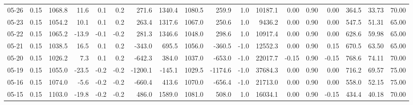\begin{threeparttable}
{\begin{tabular}{lrrrrrrrrrrrrrrrrr}
  05-26 &     0.15 & 1068.8 &              11.6 &               0.1 &                0.2 &              271.6 & 1340.4 & 1080.5 &      259.9 &                      1.0 &             10187.1 &       0.00 &      0.90 &           0.00 &            364.5 &           33.73 &                  70.00 \\
  05-23 &     0.15 & 1054.2 &              10.1 &               0.1 &                0.2 &              263.4 & 1317.6 & 1067.0 &      250.6 &                      1.0 &              9436.2 &       0.00 &      0.90 &           0.00 &            547.5 &           51.31 &                  65.00 \\
  05-22 &     0.15 & 1065.2 &             -13.9 &              -0.1 &               -0.2 &              281.3 & 1346.6 & 1048.0 &      298.6 &                      1.0 &             10917.4 &       0.00 &      0.90 &           0.00 &            628.6 &           59.98 &                  65.00 \\
  05-21 &     0.15 & 1038.5 &              16.5 &               0.1 &                0.2 &             -343.0 &  695.5 & 1056.0 &     -360.5 &                     -1.0 &             12552.3 &       0.00 &      0.90 &           0.15 &            670.5 &           63.50 &                  65.00 \\
  05-20 &     0.15 & 1026.2 &               7.3 &               0.1 &                0.2 &             -642.3 &  384.0 & 1037.0 &     -653.0 &                     -1.0 &             22017.7 &      -0.15 &      0.90 &          -0.15 &            768.6 &           74.11 &                  70.00 \\
  05-19 &     0.15 & 1055.0 &             -23.5 &              -0.2 &               -0.2 &            -1200.1 & -145.1 & 1029.5 &    -1174.6 &                     -1.0 &             37684.3 &       0.00 &      0.90 &           0.00 &            716.2 &           69.57 &                  75.00 \\
  05-16 &     0.15 & 1074.0 &              -5.6 &              -0.2 &               -0.2 &             -660.4 &  413.6 & 1070.0 &     -656.4 &                     -1.0 &             21713.0 &       0.00 &      0.90 &           0.00 &            558.0 &           52.15 &                  75.00 \\
  05-15 &     0.15 & 1103.0 &             -19.8 &              -0.2 &               -0.2 &              486.0 & 1589.0 & 1081.0 &      508.0 &                      1.0 &             16034.1 &       0.00 &      0.90 &          -0.15 &            434.4 &           40.18 &                  70.00 \\

\end{tabular}}
\end{threeparttable}
